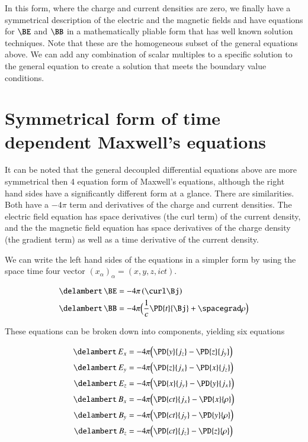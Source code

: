 In this form, where the charge and current densities are zero, we finally have 
a symmetrical description of the electric and the magnetic fields and have equations 
for $\BE$ and $\BB$ in a mathematically pliable form that has well known 
solution techniques.
Note that these are the homogeneous subset of the general equations above.
We can add any combination of scalar multiples to a specific solution 
to the general equation to create a solution that meets the boundary 
value conditions.

\section{Symmetrical form of time dependent Maxwell's equations}

It can 
be noted that the general decoupled differential equations above are more 
symmetrical then 4 equation form of Maxwell's equations, although the
right hand sides have a significantly different form at a glance.  There
are similarities.  Both have a $-4\pi$ term and derivatives of the charge and
current densities.  The electric field equation has space derivatives (the curl term) of 
the current density, and the the magnetic field equation has space derivatives of 
the charge density (the gradient term) as well as a time derivative of the current
density.

We can write the left hand sides of the equations in a simpler form by using the 
space time four vector $(x_\alpha)_\alpha = (x, y, z, ict)$.

\begin{align*}
\delambert \,\BE &= - 4\pi \left(\curl \Bj\right) \\
\delambert \,\BB &= - 4\pi \Bigl(\frac{1}{c} \PD{t}{\Bj} + \spacegrad \rho\Bigr)
\end{align*}

These equations 
can be broken down 
into components, yielding six equations

\begin{align*}
\delambert \,E_x &= - 4\pi \Bigl(\PD{y}{j_z} - \PD{z}{j_y} \Bigr) \\
\delambert \,E_y &= - 4\pi \Bigl(\PD{z}{j_x} - \PD{x}{j_z} \Bigr) \\
\delambert \,E_z &= - 4\pi \Bigl(\PD{x}{j_y} - \PD{y}{j_x} \Bigr) \\
\delambert \,B_x &= - 4\pi \Bigl(\PD{ct}{j_x} - \PD{x}{\rho} \Bigr)\\
\delambert \,B_y &= - 4\pi \Bigl(\PD{ct}{j_y} - \PD{y}{\rho} \Bigr)\\
\delambert \,B_z &= - 4\pi \Bigl(\PD{ct}{j_z} - \PD{z}{\rho} \Bigr)
\end{align*}

